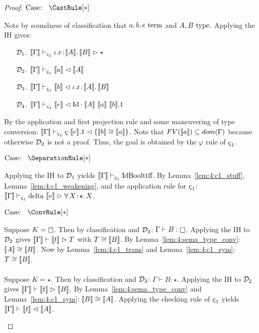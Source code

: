 \begin{proof}
    $\text{Case: }\begin{array}{c} \CastRule[*] \end{array}$
    \begin{proofcase}
        Note by soundness of classification that $a, b, e~\textnormal{term}$ and $A, B~\textnormal{type}$.
        Applying the IH gives:
        \begin{enumerate}
            \item[$\mathcal{D}_{1}$.] $\sema{\Gamma} \vdash_{\oldced} \abs{\iota}{x}{\sema{A}}{\sema{B}} \infr \star$
            \item[$\mathcal{D}_{2}$.] $\sema{\Gamma} \vdash_{\oldced} \sema{a} \chck \sema{A}$
            \item[$\mathcal{D}_{3}$.] $\sema{\Gamma} \vdash_{\oldced} \sema{b} \chck \abs{\iota}{x}{\sema{A}}{\sema{B}}$
            \item[$\mathcal{D}_{4}$.] $\sema{\Gamma} \vdash_{\oldced} \sema{e} \chck \cId \cdot \sema{A}\ \sema{a}\ \sema{b}.1$
        \end{enumerate}
        By the application and first projection rule and some maneuvering of type conversion: $\sema{\Gamma} \vdash_{\oldced} \text{\c{c}}\ \sema{e}.1 \chck \{ \sema{b} \cong \sema{a}\}$.
        Note that $FV(\llbracket a \rrbracket) \subseteq dom(\Gamma)$ because otherwise $\mathcal{D}_{2}$ is not a proof.
        Thus, the goal is obtained by the $\varphi$ rule of $\oldced$.
    \end{proofcase}

    $\text{Case: }\begin{array}{c} \SeparationRule[*] \end{array}$
    \begin{proofcase}
        Applying the IH to $\mathcal{D}_{1}$ yields $\sema{\Gamma} \vdash_{\oldced} \cId \cBool \ctt \cff$.
        By Lemma~\ref{lem:4:c1_stuff}, Lemma~\ref{lem:4:c1_weakening}, and the application rule for $\oldced$:
            $\sema{\Gamma} \vdash_{\oldced} \cdelta\ \sema{e} \infr \abs{\forall}{X}{\star}{X}$.
    \end{proofcase}

    $\text{Case: }\begin{array}{c} \ConvRule[*] \end{array}$
    \begin{proofcase}
        Suppose $K = \kind$.
        Then by classification and $\mathcal{D}_{3}$: $\Gamma \vdash B : \kind$.
        Applying the IH to $\mathcal{D}_{2}$ gives $\llbracket \Gamma \rrbracket \vdash \llbracket t \rrbracket \vartriangleright T$ with $T \cong \llbracket B \rrbracket$.
        By Lemma~\ref{lem:4:sema_type_conv}: $\llbracket A \rrbracket \cong \llbracket B \rrbracket$.
        Now by Lemma~\ref{lem:4:c1_trans} and Lemma~\ref{lem:4:c1_sym}: $T \cong \llbracket B \rrbracket$.
        \\ \\
        Suppose $K = \star$.
        Then by classification and $\mathcal{D}_{3}$: $\Gamma \vdash B : \star$.
        Applying the IH to $\mathcal{D}_{2}$ gives $\llbracket \Gamma \rrbracket \vdash \llbracket t \rrbracket \vartriangleright \llbracket B \rrbracket$.
        By Lemma~\ref{lem:4:sema_type_conv} and Lemma~\ref{lem:4:c1_sym}: $\llbracket B \rrbracket \cong \llbracket A \rrbracket$.
        Applying the checking rule of $\oldced$ yields $\llbracket \Gamma \rrbracket \vdash \llbracket t \rrbracket \vartriangleleft \llbracket A \rrbracket$.
    \end{proofcase}
\end{proof}

